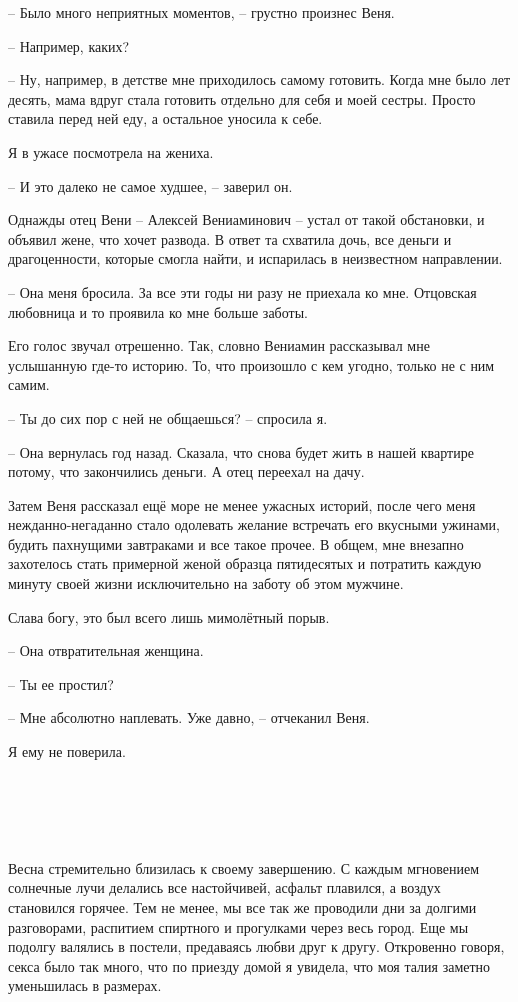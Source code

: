 \documentclass[
]{book}
\begin{document}
-- Было много неприятных моментов, -- грустно произнес Веня.

-- Например, каких?

-- Ну, например, в детстве мне приходилось самому готовить. Когда мне было лет десять, мама вдруг стала готовить отдельно для себя и моей сестры. Просто ставила перед ней еду, а остальное уносила к себе.

Я в ужасе посмотрела на жениха.

-- И это далеко не самое худшее, -- заверил он.

Однажды отец Вени -- Алексей Вениаминович -- устал от такой обстановки, и объявил жене, что хочет развода. В ответ та схватила дочь, все деньги и драгоценности, которые смогла найти, и испарилась в неизвестном направлении.

-- Она меня бросила. За все эти годы ни разу не приехала ко мне. Отцовская любовница и то проявила ко мне больше заботы.

Его голос звучал отрешенно. Так, словно Вениамин рассказывал мне услышанную где-то историю. То, что произошло с кем угодно, только не с ним самим.

-- Ты до сих пор с ней не общаешься? -- спросила я.

-- Она вернулась год назад. Сказала, что снова будет жить в нашей квартире потому, что закончились деньги. А отец переехал на дачу.

Затем Веня рассказал ещё море не менее ужасных историй, после чего меня нежданно-негаданно стало одолевать желание встречать его вкусными ужинами, будить пахнущими завтраками и все такое прочее. В общем, мне внезапно захотелось стать примерной женой образца пятидесятых и потратить каждую минуту своей жизни исключительно на заботу об этом мужчине.

Слава богу, это был всего лишь мимолётный порыв.

-- Она отвратительная женщина.

-- Ты ее простил?

-- Мне абсолютно наплевать. Уже давно, -- отчеканил Веня.

Я ему не поверила.

\hypertarget{chapter-20}{%
\chapter{~}\label{chapter-20}}

Весна стремительно близилась к своему завершению. С каждым мгновением солнечные лучи делались все настойчивей, асфальт плавился, а воздух становился горячее. Тем не менее, мы все так же проводили дни за долгими разговорами, распитием спиртного и прогулками через весь город. Еще мы подолгу валялись в постели, предаваясь любви друг к другу. Откровенно говоря, секса было так много, что по приезду домой я увидела, что моя талия заметно уменьшилась в размерах.
\end{document}
